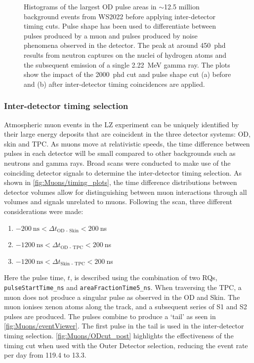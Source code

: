 \begin{figure}[htbp]
{    Histograms of the largest OD pulse areas in $\sim$12.5 million background events from WS2022 before applying inter-detector timing cuts. Pulse shape has been used to differentiate between pulses produced by a muon and pulses produced by noise phenomena observed in the detector. The peak at around 450~phd results from neutron captures on the nuclei of hydrogen atoms and the subsequent emission of a single 2.22~MeV gamma ray. The plots show the impact of the 2000~phd cut and pulse shape cut (a) before and (b) after inter-detector timing coincidences are applied.}%
    \label{fig:Muons/ODSpectra}
\end{figure}

\subsubsection{Inter-detector timing selection}\label{sec:Muons/MuonFluxTimingSelection}
Atmospheric muon events in the LZ experiment can be uniquely identified by their large energy deposits that are coincident in the three detector systems: OD, skin and TPC. As muons move at relativistic speeds, the time difference between pulses in each detector will be small compared to other backgrounds such as neutrons and gamma rays.
Broad scans were conducted to make use of the coinciding detector signals to determine the inter-detector timing selection. As shown in \autoref{fig:Muons/timing_plots}, the time difference distributions between detector volumes allow for distinguishing between muon interactions through all volumes and signals unrelated to muons. Following the scan, three different considerations were made:
 \begin{enumerate}
    \item $-200~\text{ns} < \Delta t_{\text{OD - Skin}} < 200~$ns
    \item $-1200~\text{ns} < \Delta t_{\text{OD - TPC}} < 200~$ns
    \item $-1200~\text{ns} < \Delta t_{\text{Skin - TPC}} < 200~$ns
\end{enumerate}
Here the pulse time, $t$, is described using the combination of two RQs, \texttt{pulseStartTime\_ns} and \texttt{areaFractionTime5\_ns}. When traversing the TPC, a muon does not produce a singular pulse as observed in the OD and Skin. The muon ionises xenon atoms along the track, and a subsequent series of S1 and S2 pulses are produced. The pulses combine to produce a `tail' as seen in \autoref{fig:Muons/eventViewer}. The first pulse in the tail is used in the inter-detector timing selection. \autoref{fig:Muons/ODcut_post} highlights the effectiveness of the timing cut when used with the Outer Detector selection, reducing the event rate per day from 119.4 to 13.3.

